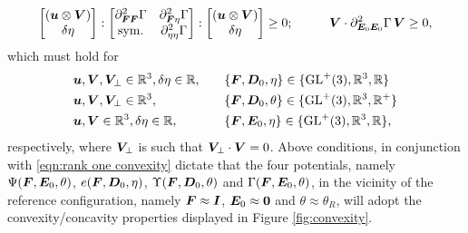 \begin{equation}
\begin{aligned}
\begin{bmatrix}
\left(\vect{u}\otimes\vect{V}\right)\\
\delta \eta
\end{bmatrix}:\begin{bmatrix}
\partial^2_{\vect{F}\vect{F}}\Gamma   &  \partial^2_{\vect{F}\eta}\Gamma\\
%
\text{sym.} & \partial^2_{\eta\eta}\Gamma
\end{bmatrix}:\begin{bmatrix}
\left(\vect{u}\otimes\vect{V}\right)\\
\delta \eta
\end{bmatrix}
\geq 0;&\qquad
%
&\vect{V}\cdot \partial^2_{\vect{E}_0\vect{E}_0}\Gamma\, \vect{V}\geq 0,
%
%
\end{aligned}
\end{equation}
%
%
%
%
which must hold for 
%
\begin{equation}
\begin{aligned}
& \vect{u},\vect{V},\vect{V}_{\perp}
\in \mathbb{R}^{3}, \delta\eta\in\mathbb{R},&\quad&\{\vect{F},\vect{D}_0,\eta\}\in\{\text{GL}^{+}(3),\mathbb{R}^3,\mathbb{R}\}	\\
&\vect{u},\vect{V},\vect{V}_{\perp}\in \mathbb{R}^{3},&\quad&\{\vect{F},\vect{D}_0,\theta\}\in\{\text{GL}^{+}(3),\mathbb{R}^3,\mathbb{R}^{+}\}\\
%
&\vect{u},\vect{V}\in \mathbb{R}^{3}, \delta\eta\in\mathbb{R},&\quad&\{\vect{F},\vect{E}_0,\eta\}\in\{\text{GL}^{+}(3),\mathbb{R}^3,\mathbb{R}\},		 
\end{aligned}	
\end{equation}
%
%
respectively, where $\boldsymbol{V}_{\perp}$ is such that $\boldsymbol{V}_{\perp}\cdot \boldsymbol{V}=0$. Above conditions, in conjunction with \eqref{eqn:rank one convexity} dictate that the four potentials, namely $\Psi(\boldsymbol{F},\boldsymbol{E}_0,\theta)$, $e(\boldsymbol{F},\boldsymbol{D}_0,\eta)$, $\Upsilon(\boldsymbol{F},\boldsymbol{D}_0,\theta)$ and $\Gamma(\boldsymbol{F},\boldsymbol{E}_0,\theta)$, in the vicinity of the reference configuration, namely $\boldsymbol{F}\approx \boldsymbol{I}$, $\boldsymbol{E}_0\approx \boldsymbol{0}$ and $\theta\approx \theta_R$, will adopt the convexity/concavity properties displayed in Figure \eqref{fig:convexity}.

